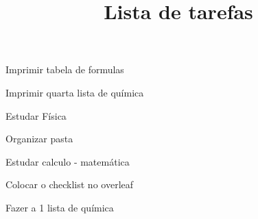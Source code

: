 \title{Lista de tarefas}





\begin{checklist}
  \item{Imprimir tabela de formulas}
  \item{Imprimir quarta lista de química}
  \item{Estudar Física}
  \item{Organizar pasta}
  \item{Estudar calculo - matemática}
  \item{Colocar o checklist no overleaf} 
  \item{Fazer a 1 lista de química}
\end{checklist}


